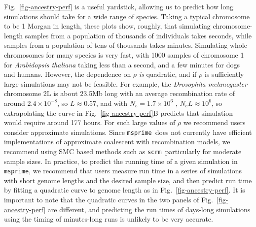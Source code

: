 \documentclass{article}
\newcommand{\msprime}[0]{\texttt{msprime}}
\newcommand{\scrm}[0]{\texttt{scrm}}
\begin{document}
Fig.~\ref{fig-ancestry-perf} is a useful yardstick, allowing us
to predict how long simulations should take for a wide range of
species. Taking a typical chromosome to be 1 Morgan in length,
these plots show, roughly, that simulating chromosome-length
samples from a population of thousands of individuals takes seconds,
while samples from a population of tens of thousands takes minutes.
Simulating whole chromosomes for many species is very fast,
with 1000 samples of chromosome 1 for
\emph{Arabidopsis thaliana} taking less than a second, and a few
minutes for dogs and humans. However, the dependence on $\rho$
\emph{is} quadratic, and if $\rho$ is sufficiently large simulations
may not be feasible. For example,
the \emph{Drosophila melanogaster} chromosome 2L
is about 23.5Mb long with an average recombination rate of around $2.4 \times 10^{-8}$,
so $L \approx 0.57$,
and with $N_e = 1.7 \times 10^6$ \citep{li2006inferring},
$N_e L \approx 10^6$, so extrapolating the curve in Fig.~\ref{fig-ancestry-perf}B
predicts that simulation would require around 177 hours.
For such large values of $\rho$  we recommend
users consider approximate simulations. Since \msprime\ does not currently
have efficient implementations of approximate coalescent with recombination
models, we recommend using SMC based methods such as \scrm\,
particularly for moderate sample sizes.
In practice, to predict the running time of a given
simulation in \msprime, we recommend that users
measure run time in a series of simulations with short genome lengths and
the desired sample size,
and then predict run time by fitting a quadratic curve to genome length
as in Fig.~\ref{fig-ancestry-perf}.
It is important to note that the quadratic curves in the two
panels of Fig.~\ref{fig-ancestry-perf} are different, and
predicting the run times of days-long simulations
using the timing of minutes-long runs is unlikely to be very accurate.
\end{document}
